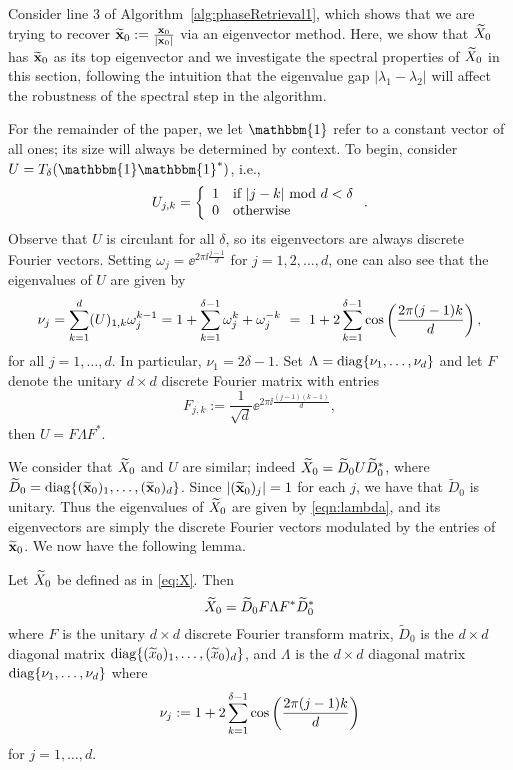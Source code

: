 Consider line 3 of Algorithm~\ref{alg:phaseRetrieval1}, which shows that we are trying to recover $\widetilde{\mathbf x}_0:= \frac{{\mathbf x_0}}{|\mathbf x_0|}$ via an eigenvector method. Here, we show that  $\widetilde{X}_0$ has $\widetilde{\mathbf x}_0$ as its top eigenvector and we investigate the spectral properties of $\widetilde{X}_0$ in this section, following the intuition that the eigenvalue gap $|\lambda_1 - \lambda_2|$ will affect the robustness of the spectral step in the algorithm.

For the remainder of the paper, we let $\mathbbm{1}$ refer to a constant vector of all ones; its size will always be determined by context.  To begin, consider $U = T_\delta(\mathbbm{1}\mathbbm{1}^*)$, i.e., 
\begin{equation}
U_{j,k} =  \left\{ \begin{array}{ll} 1 & \textrm{if}~| j - k |~{\rm mod}~d  < \delta \\ 0 & \textrm{otherwise} \end{array} \right..
\label{equ:NormedUmatSPG}
\end{equation}
Observe that $U$ is circulant for all $\delta$, so its eigenvectors are always discrete Fourier vectors.  Setting $\omega_j = \ee^{2\pi\ii\frac{j-1}{d}}$ for $j = 1, 2, \ldots, d$, one can also see that the eigenvalues of $U$ are given by 
\begin{equation}
\nu_j = \sum_{k = 1}^d (U)_{1,k}\omega_j^{k-1} = 1 + \sum_{k = 1}^{\delta - 1}\omega_j^k + \omega_j^{-k} ~=~ 1 + 2 \sum_{k = 1}^{\delta - 1}\cos\left(\frac{\displaystyle 2\pi (j-1) k}{\displaystyle d}\right),
\label{eqn:lambda}
\end{equation}
for all $j = 1, \dots, d$.  In particular, $\nu_1 = 2 \delta - 1$.  Set $\Lambda = \mathrm{diag}\{\nu_1, \ldots, \nu_{d}\}$ and let $F$ denote the unitary $d \times d$ discrete Fourier matrix with entries $$F_{j,k} := \frac{1}{\sqrt{d}} \ee^{2\pi\ii\frac{(j-1)(k-1)}{d}},$$ then $U = F \Lambda F^*$.

We consider that $\widetilde{X}_0$ and $U$ are similar; indeed $\widetilde{X}_0 = \widetilde{D}_0 U \widetilde{D}_0^*$, where $\widetilde{D}_0 = \mathrm{diag}\{(\widetilde{\mathbf x}_0)_1, \ldots, (\widetilde{\mathbf x}_0)_d\}$.  Since $|(\widetilde{\mathbf x}_0)_j| = 1$ for each $j$, we have that $\widetilde{D}_0$ is unitary.  Thus the eigenvalues of $\widetilde{X}_0$ are given by \eqref{eqn:lambda}, and its eigenvectors are simply the discrete Fourier vectors modulated by the entries of $\widetilde{\mathbf x}_0$.  We now have the following lemma.

\begin{lemma}
Let $\widetilde{X}_0$ be defined as in \eqref{eq:X}.  Then $$\widetilde{X}_0 = \widetilde{D}_0 F \Lambda F^* \widetilde{D}_0^*$$ where $F$ is the unitary $d \times d$ discrete Fourier transform matrix, $\widetilde{D}_0$ is the $d \times d$ diagonal matrix $\mathrm{diag}\{(\widetilde{x}_0)_1, \ldots, (\widetilde{x}_0)_d\}$, and $\Lambda$ is the $d \times d$ diagonal matrix $\mathrm{diag}\{\nu_1, \ldots, \nu_{d}\}$ where
$$\nu_j := 1 + 2 \sum_{k = 1}^{\delta - 1}\cos\left(\frac{\displaystyle 2\pi (j-1) k}{\displaystyle d}\right)$$
for $j = 1, \dots, d$.
\label{lem:spectrum}
\end{lemma}

